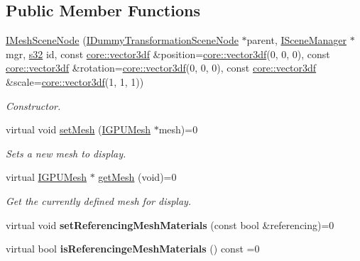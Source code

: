 \subsection*{Public Member Functions}
\begin{DoxyCompactItemize}
\item 
\hyperlink{classirr_1_1scene_1_1IMeshSceneNode_ab528ef0063ebfe5d288fcc6f68282417}{I\+Mesh\+Scene\+Node} (\hyperlink{classirr_1_1scene_1_1IDummyTransformationSceneNode}{I\+Dummy\+Transformation\+Scene\+Node} $\ast$parent, \hyperlink{classirr_1_1scene_1_1ISceneManager}{I\+Scene\+Manager} $\ast$mgr, \hyperlink{namespaceirr_ac66849b7a6ed16e30ebede579f9b47c6}{s32} id, const \hyperlink{namespaceirr_1_1core_a06f169d08b5c429f5575acb7edbad811}{core\+::vector3df} \&position=\hyperlink{namespaceirr_1_1core_a06f169d08b5c429f5575acb7edbad811}{core\+::vector3df}(0, 0, 0), const \hyperlink{namespaceirr_1_1core_a06f169d08b5c429f5575acb7edbad811}{core\+::vector3df} \&rotation=\hyperlink{namespaceirr_1_1core_a06f169d08b5c429f5575acb7edbad811}{core\+::vector3df}(0, 0, 0), const \hyperlink{namespaceirr_1_1core_a06f169d08b5c429f5575acb7edbad811}{core\+::vector3df} \&scale=\hyperlink{namespaceirr_1_1core_a06f169d08b5c429f5575acb7edbad811}{core\+::vector3df}(1, 1, 1))
\begin{DoxyCompactList}\small\item\em Constructor. \end{DoxyCompactList}\item 
virtual void \hyperlink{classirr_1_1scene_1_1IMeshSceneNode_a661d6526a4cdde01c5c57592e2efdac8}{set\+Mesh} (\hyperlink{classirr_1_1scene_1_1IMesh}{I\+G\+P\+U\+Mesh} $\ast$mesh)=0
\begin{DoxyCompactList}\small\item\em Sets a new mesh to display. \end{DoxyCompactList}\item 
virtual \hyperlink{classirr_1_1scene_1_1IMesh}{I\+G\+P\+U\+Mesh} $\ast$ \hyperlink{classirr_1_1scene_1_1IMeshSceneNode_a517eb714d4e8f994f0c70d33330dc93c}{get\+Mesh} (void)=0
\begin{DoxyCompactList}\small\item\em Get the currently defined mesh for display. \end{DoxyCompactList}\item 
virtual void {\bfseries set\+Referencing\+Mesh\+Materials} (const bool \&referencing)=0\hypertarget{classirr_1_1scene_1_1IMeshSceneNode_a280ca3401011074a69b19ba4fb1cf9a1}{}\label{classirr_1_1scene_1_1IMeshSceneNode_a280ca3401011074a69b19ba4fb1cf9a1}

\item 
virtual bool {\bfseries is\+Referencinge\+Mesh\+Materials} () const  =0\hypertarget{classirr_1_1scene_1_1IMeshSceneNode_a0bc184c21fd1cedfe95bc5219d6ec812}{}\label{classirr_1_1scene_1_1IMeshSceneNode_a0bc184c21fd1cedfe95bc5219d6ec812}

\end{DoxyCompactItemize}
